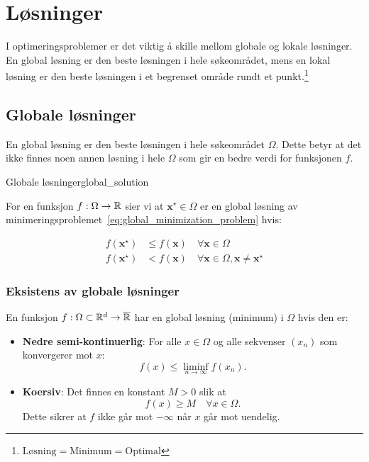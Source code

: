 \section{Løsninger}
\label{sec:solutions}
I optimeringsproblemer er det viktig å skille mellom globale og lokale løsninger. En global løsning er den beste løsningen i hele søkeområdet, mens en lokal løsning er den beste løsningen i et begrenset område rundt et punkt.\footnote{\(\text{Løsning} = \text{Minimum} = \text{Optimal}\)}

\subsection{Globale løsninger}
En global løsning er den beste løsningen i hele søkeområdet \(\Omega\). Dette betyr at det ikke finnes noen annen løsning i hele \(\Omega\) som gir en bedre verdi for funksjonen \(f\).

\begin{definition}{Globale løsninger}{global_solution}

	\medskip
	For en funksjon \(f: \Omega \to \mathbb{R}\) sier vi at \(\symbf{x}^\star \in \Omega\) er en global løsning av minimeringsproblemet~\eqref{eq:global_minimization_problem} hvis:

	\begin{align*}
		f(\symbf{x}^\star) & \leq f(\symbf{x}) \quad \forall \symbf{x} \in \Omega \tag{Global}                                      \\
		f(\symbf{x}^\star) & < f(\symbf{x}) \quad \forall \symbf{x} \in \Omega, \symbf{x} \neq \symbf{x}^\star \tag{Strengt Global}
	\end{align*}
\end{definition}

\subsubsection{Eksistens av globale løsninger}

En funksjon \(f: \Omega \subset \mathbb{R}^d \to \overline{\mathbb{R}}\) har en global løsning (minimum) i \(\Omega\) hvis den er:

\begin{itemize}
	\item \textbf{Nedre semi-kontinuerlig}: For alle \(x \in \Omega\) og alle sekvenser \((x_n)\) som konvergerer mot \(x\):
	      \[
		      f(x) \leq \liminf_{n \to \infty} f(x_n).
	      \]
	\item \textbf{Koersiv}: Det finnes en konstant \(M > 0\) slik at
	      \[
		      f(x) \geq M \quad \forall x \in \Omega.
	      \]
	      Dette sikrer at \(f\) ikke går mot \(-\infty\) når \(x\) går mot uendelig.
\end{itemize}

